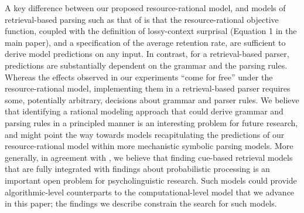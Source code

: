 A key difference between our proposed resource-rational model, and models of retrieval-based parsing such as that of \citet{lewis2005activation} is that the resource-rational objective function, coupled with the definition of lossy-context surprisal (Equation 1 in the main paper), and a specification of the average retention rate, are sufficient to derive model predictions on any input.
In contrast, for a retrieval-based parser, predictions are substantially dependent on the grammar and the parsing rules.
Whereas the effects observed in our experiments ``come for free'' under the resource-rational model, implementing them in a retrieval-based parser requires some, potentially arbitrary, decisions about grammar and parser rules.
We believe that identifying a rational modeling approach that could derive grammar and parsing rules in a principled manner is an interesting problem for future research, and might point the way towards models recapitulating the predictions of our resource-rational model within more mechanistic symbolic parsing models.
More generally, in agreement with \citet{parker2017cue}, we believe that finding cue-based retrieval models that are fully integrated with findings about probabilistic processing is an important open problem for psycholinguistic research. 
Such models could provide algorithmic-level counterparts to the computational-level model that we advance in this paper; the findings we describe constrain the search for such models.






